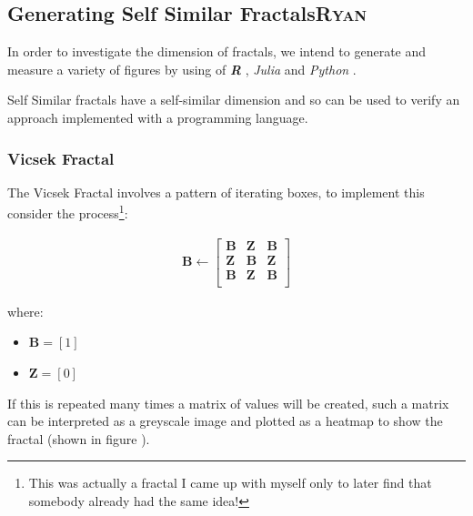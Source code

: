 \documentclass[a4paper,11pt,twoside]{article}
\begin{document}
\subsection{Generating Self Similar Fractals\hfill{}\textsc{Ryan}}
\label{sec:orgb50fb2b}
In order to investigate the dimension of fractals, we intend to generate and measure a variety of figures by using of \textbf{\emph{R}} \cite{rcoreteamLanguageEnvironmentStatistical2020}, \emph{Julia} \cite{bezansonJuliaFreshApproach2017} and \emph{Python} \cite{WelcomePythonOrg}.

Self Similar fractals have a self-similar dimension and so can be used to verify an approach implemented with a programming language.

\subsubsection{Vicsek Fractal}
\label{vicsek-fractal}
The Vicsek Fractal \cite[p. 12]{vicsekFractalGrowthPhenomena1992} involves a pattern of iterating boxes, to implement this consider the process\footnote{This was actually a fractal I came up with myself only to later find that somebody already had the same idea!}:



\begin{align}
\mathbf{B} \leftarrow
   \begin{bmatrix}
       \mathbf{B} & \mathbf{Z} & \mathbf{B} \\
       \mathbf{Z} & \mathbf{B} & \mathbf{Z} \\
       \mathbf{B} & \mathbf{Z} & \mathbf{B} \\
   \end{bmatrix} \label{eq:visek-iter}
\end{align}

where:

\begin{itemize}
\item \(\mathbf{B}= \left[ 1 \right]\)
\item \(\mathbf{Z}= \left[ 0 \right]\)
\end{itemize}


If this is repeated many times a matrix of values will be created, such a matrix
can be interpreted as a greyscale image and plotted as a heatmap to show the
fractal (shown in figure ).
\end{document}
